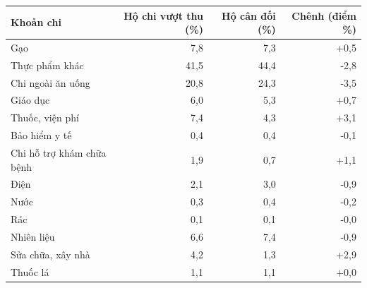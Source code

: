 \begin{tabular}{lrrr}
\toprule
Khoản chi & Hộ chi vượt thu (\%) & Hộ cân đối (\%) & Chênh (điểm \%) \\
\midrule
Gạo & 7,8 & 7,3 & +0,5 \\
Thực phẩm khác & 41,5 & 44,4 & -2,8 \\
Chi ngoài ăn uống & 20,8 & 24,3 & -3,5 \\
Giáo dục & 6,0 & 5,3 & +0,7 \\
Thuốc, viện phí & 7,4 & 4,3 & +3,1 \\
Bảo hiểm y tế & 0,4 & 0,4 & -0,1 \\
Chi hỗ trợ khám chữa bệnh & 1,9 & 0,7 & +1,1 \\
Điện & 2,1 & 3,0 & -0,9 \\
Nước & 0,3 & 0,4 & -0,2 \\
Rác & 0,1 & 0,1 & -0,0 \\
Nhiên liệu & 6,6 & 7,4 & -0,9 \\
Sửa chữa, xây nhà & 4,2 & 1,3 & +2,9 \\
Thuốc lá & 1,1 & 1,1 & +0,0 \\
\bottomrule
\end{tabular}
